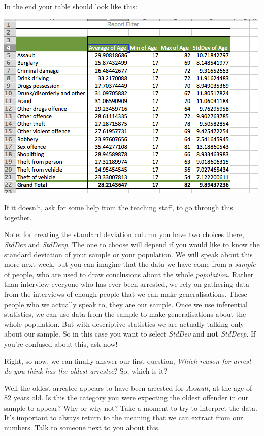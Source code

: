 \documentclass[
]{book}
\begin{document}
In the end your table should look like this:

\includegraphics{imgs/reason_v_age_no_med.png}

If it doesn't, ask for some help from the teaching staff, to go through this together.

Note: for creating the standard deviation column you have two choices there, \emph{StdDev} and \emph{StdDevp}. The one to choose will depend if you would like to know the standard deviation of your sample or your population. We will speak about this more next week, but you can imagine that the data we have come from a \emph{sample} of people, who are used to draw conclusions about the whole \emph{population}. Rather than interview everyone who has ever been arrested, we rely on gathering data from the interviews of enough people that we can make generalisations. These people who we actually speak to, they are our sample. Once we use inferential statistics, we can use data from the sample to make generalisations about the whole population. But with descriptive statistics we are actually talking only about our sample. So in this case you want to select \emph{StdDev} and \textbf{not} \emph{StdDevp}. If you're confused about this, ask now!

Right, so now, we can finally answer our first question, \emph{Which reason for arrest do you think has the oldest arrestee}? So, which is it?

Well the oldest arrestee appears to have been arrested for \emph{Assault}, at the age of 82 years old. Is this the category you were expecting the oldest offender in our sample to appear? Why or why not? Take a moment to try to interpret the data. It's important to always return to the meaning that we can extract from our numbers. Talk to someone next to you about this.
\end{document}
